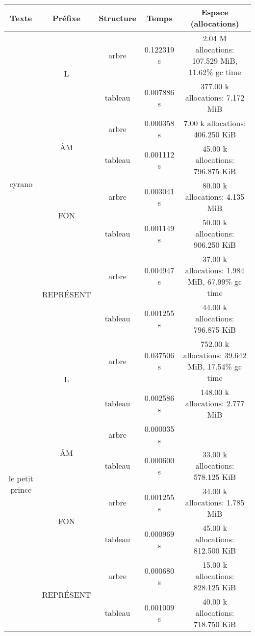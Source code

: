 \documentclass[a4paper,12pt]{article}
\begin{document}
\begin{center}
  \begin{tabular}{|c|c|c|c|c|}
    \hline
    Texte & Préfixe & Structure & Temps & Espace (allocations) \\
    \hline
    \multirow{8}{*}{cyrano} & \multirow{2}{*}{L} & arbre & 0.122319 s & 2.04 M allocations: 107.529 MiB, 11.62\% gc time\\
    \cline{3-5}
    &  & tableau &  0.007886 s & 377.00 k allocations: 7.172 MiB\\
    \cline{2-5}
    & \multirow{2}{*}{ÂM} & arbre & 0.000358 s & 7.00 k allocations: 406.250 KiB\\
    \cline{3-5}
    & & tableau & 0.001112 s & 45.00 k allocations: 796.875 KiB\\
    \cline{2-5}
    & \multirow{2}{*}{FON} & arbre & 0.003041 s & 80.00 k allocations: 4.135 MiB\\
    \cline{3-5}
    & & tableau & 0.001149 s & 50.00 k allocations: 906.250 KiB\\
    \cline{2-5}
    & \multirow{2}{*}{REPRÉSENT} & arbre & 0.004947 s & 37.00 k allocations: 1.984 MiB, 67.99\% gc time\\
    \cline{3-5}
    & & tableau & 0.001255 s & 44.00 k allocations: 796.875 KiB\\
    \hline
    \multirow{8}{*}{le petit prince} & \multirow{2}{*}{L} & arbre & 0.037506 s & 752.00 k allocations: 39.642 MiB, 17.54\% gc time\\
    \cline{3-5}
    & & tableau & 0.002586 s & 148.00 k allocations: 2.777 MiB\\
    \cline{2-5}
    & \multirow{2}{*}{ÂM} & arbre & 0.000035 s  & \\
    \cline{3-5}
    & & tableau & 0.000600 s & 33.00 k allocations: 578.125 KiB\\
     \cline{2-5}
    & \multirow{2}{*}{FON} & arbre & 0.001255 s & 34.00 k allocations: 1.785 MiB\\
    \cline{3-5}
    & & tableau & 0.000969 s & 45.00 k allocations: 812.500 KiB\\
    \cline{2-5}
    & \multirow{2}{*}{REPRÉSENT} & arbre & 0.000680 s & 15.00 k allocations: 828.125 KiB\\
    \cline{3-5}
    &  & tableau & 0.001009 s & 40.00 k allocations: 718.750 KiB\\
    \hline

  \end{tabular}
\end{center}
 
\end{document}

